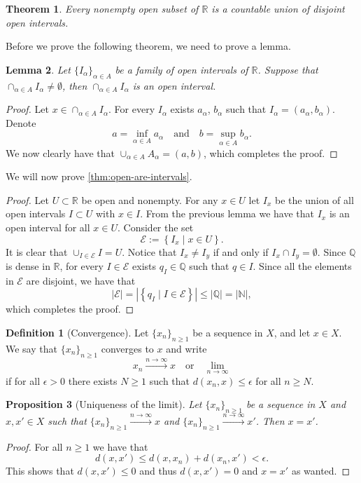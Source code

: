 \documentclass[11pt,a4paper]{article}
\theoremstyle{definition}
\newtheorem{definition}{Definition}[section]
\theoremstyle{plain}
\newtheorem{theorem}{Theorem}[section]
\newtheorem{proposition}[theorem]{Proposition}
\newtheorem{lemma}[theorem]{Lemma}
\newcommand{\N}{\mathbb{N}}
\newcommand{\Q}{\mathbb{Q}}
\newcommand{\R}{\mathbb{R}}
\newcommand{\set}[2]{ \left\{ #1 \mid #2 \right\} }
\newcommand{\abs}[1]{\left\lvert #1\right\rvert}
\begin{document}
  \begin{theorem}\label{thm:open-are-intervals}
    Every nonempty open subset of $\R$ is a countable union of disjoint
    open intervals.
  \end{theorem}
  Before we prove the following theorem, we need to prove a lemma.
  \begin{lemma}
    Let $\{I_\alpha\}_{\alpha \in A}$ be a family of open intervals of $\R$.
    Suppose that $\cap_{\alpha \in A} I_\alpha \neq \emptyset$, then 
    $\cap_{\alpha \in A} I_\alpha$ is an open interval.
  \end{lemma}
  \begin{proof}
    Let $x \in \cap_{\alpha \in A} I_\alpha$. For every $I_\alpha$ exists 
    $a_\alpha$, $b_\alpha$ such that $I_\alpha = (a_\alpha,b_\alpha)$.
    Denote
    \[
      a = \inf_{\alpha \in A} a_\alpha \quad \text{and} \quad
      b = \sup_{\alpha \in A} b_\alpha.
    \]
    We now clearly have that $\cup_{\alpha \in A} A_\alpha = (a,b)$, 
    which completes the proof.
  \end{proof}
  We will now prove \autoref{thm:open-are-intervals}.
  \begin{proof}
    Let $U \subset \R$ be open and nonempty.
    For any $x \in U$ let $I_x$ be the union of all open intervals $I \subset U$
    with $x \in I$.
    From the previous lemma we have that $I_x$ is an open interval for all
    $x \in U$. Consider the set
    \[
      \mathcal{E} := \set{I_x}{x \in U}.
    \]
    It is clear that $\cup_{I \in \mathcal E} I = U$.
    Notice that $I_x \neq I_y$ if and only if $I_x \cap I_y = \emptyset$.
    Since $\Q$ is dense in $\R$, for every $I \in \mathcal E$ exists 
    $q_I \in \Q$ such that $q \in I$. Since all the elements in $\mathcal E$
    are disjoint, we have that
    \[
      \abs{\mathcal E} =
      \abs{\set{q_I}{I \in \mathcal E}} \le
      \abs{\Q} =
      \abs{\N},
    \]
    which completes the proof.
  \end{proof}

  \begin{definition}[Convergence]
    Let $\{x_n\}_{n \geq 1}$ be a sequence in $X$, and let $x \in X$.
    We say that $\{x_n\}_{n \geq 1}$ converges to $x$ and write
    \[
      x_n \xrightarrow{n \to \infty} x \quad \text{or} \quad \lim_{n \to \infty}
    \]
    if for all $\epsilon > 0$ there exists $N \geq 1$ such that
    $d(x_n,x) \le \epsilon$ for all $n \geq N$.
  \end{definition}

  \begin{proposition}[Uniqueness of the limit]
    Let $\{x_n\}_{n \geq 1}$ be a sequence in $X$ and $x, x' \in X$ such
    that $\{x_n\}_{n \geq 1} \xrightarrow{n \to \infty} x$ and
    $\{x_n\}_{n \geq 1} \xrightarrow{n \to \infty} x'$. Then $x = x'$.
  \end{proposition}
  \begin{proof}
    For all $n \geq 1$ we have that
    \[
      d(x,x') \le d(x,x_n) + d(x_n,x') < \epsilon.
    \]
    This shows that $d(x,x') \le 0$ and thus $d(x,x') = 0$ and $x = x'$
    as wanted.
  \end{proof}
  
\end{document}
